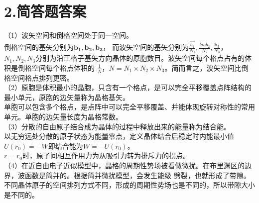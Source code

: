 \documentclass[UTF8]{ctexart}
\begin{document}
\section*{\bfseries 2.简答题答案}
（1）波矢空间和倒格空间处于同一空间。\\
倒格空间的基矢分别为$\bm{b_1},\bm{b_2},\bm{b_3}$，
而波矢空间的基矢分别为$\frac{\vec{b_1}}{N_1},\frac{bm{b_2}}{N_2},\frac{\bm{b_3}}{N_3}$，
$N_1,N_2,N_3$分别为沿正格子基矢方向晶体的原胞数目。波矢空间每个格点占有的体积是倒格空间每个格点体积的
$\frac{1}{N}$，$N=N_1\times N_2\times N_3$。简而言之，波矢空间比倒格空间格点排列更密。\\
（2）原胞是体积最小的晶胞，只含有一个格点，是可以完全平移覆盖点阵结构的最小单元，原胞的边矢量称为晶格基矢。\\
单胞可以包含多个格点，是点阵中可以完全平移覆盖、并能体现旋转对称性的常用单元。单胞的边矢量长度为晶格常数。\\
（3）分散的自由原子结合成为晶体的过程中释放出来的能量称为结合能。\\
以无穷远处分散的原子状态为能量零点，定义晶体结合后稳定时内能最小值$U(r_0)=-W$即结合能为$W=-U(r_0)$。\\
$r=r_0$时，原子间相互作用力为从吸引力转为排斥力的拐点。\\
（4）在近自由电子近似模型中，晶格的周期性势场被看做微扰。在布里渊区的边界，波函数是简并的。根据简并微扰模型，会发生能级
劈裂，也就形成了带隙。\\
不同晶体原子的空间排列方式不同，形成的周期性势场也是不同的，所以带隙大小是不同的。\\
\end{document}
